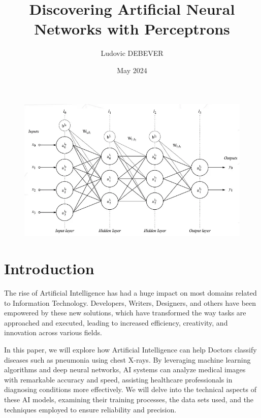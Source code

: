 \documentclass{article}
\title{Discovering Artificial Neural Networks with Perceptrons}
\author{Ludovic DEBEVER}
\date{May 2024}
\begin{document}
\maketitle

 
\begin{figure}[!h]
    \centering
    \includegraphics[width=1\linewidth]{assets/cover.png}
    \label{fig:cover}
\end{figure}

\newpage

\section{Introduction}

The rise of Artificial Intelligence has had a huge impact on most domains related to Information Technology. Developers, Writers, Designers, and others have been empowered by these new solutions, which have transformed the way tasks are approached and executed, leading to increased efficiency, creativity, and innovation across various fields.

In this paper, we will explore how Artificial Intelligence can help Doctors classify diseases such as pneumonia using chest X-rays. By leveraging machine learning algorithms and deep neural networks, AI systems can analyze medical images with remarkable accuracy and speed, assisting healthcare professionals in diagnosing conditions more effectively. We will delve into the technical aspects of these AI models, examining their training processes, the data sets used, and the techniques employed to ensure reliability and precision.
\end{document}
